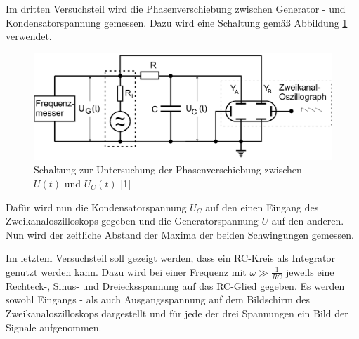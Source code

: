 Im dritten Versuchsteil wird die Phasenverschiebung zwischen Generator - und 
Kondensatorspannung gemessen. Dazu wird eine Schaltung gemäß Abbildung \ref{fig:aufbau3}
verwendet. 

\begin{figure}
\centering
\includegraphics[scale=0.2]{content/aufbau3.png}
\caption{Schaltung zur Untersuchung der Phasenverschiebung zwischen $U(t)$ und $U_C(t)$ [1]}
\label{fig:aufbau3}
\end{figure}

Dafür wird nun die Kondensatorspannung $U_C$ auf den einen Eingang des 
Zweikanaloszilloskops gegeben und die Generatorspannung $U$ auf den anderen. 
Nun wird der zeitliche Abstand der Maxima der beiden Schwingungen gemessen. 

Im letztem Versuchsteil soll gezeigt werden, dass ein RC-Kreis als Integrator 
genutzt werden kann. Dazu wird bei einer Frequenz mit $\omega \gg \frac{1}{RC}$ 
jeweils eine Rechteck-, Sinus- und Dreiecksspannung auf das RC-Glied gegeben. 
Es werden sowohl Eingangs - als auch Ausgangsspannung auf dem Bildschirm des 
Zweikanaloszilloskops dargestellt und für jede der drei Spannungen ein Bild der 
Signale aufgenommen. 


